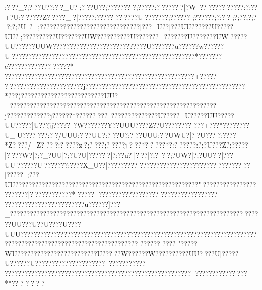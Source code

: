{{{{{{{{{{{{{{{{{{{{{{{{{{{{{{{{{{{{{{{{{{{{{{{{{{{{{{{{{{{{{{{{{{{{{{{{{{{{{{{{{{{{{{{{{{{{{{{{{{{{{{{{{{{{{{{{{{{{{{{{{{{{{{{{{{{{{{{{{{{{{{{{{{{{{{{{{{{{{{{{{{{{{{{{{{{{{{{{{{{{{{{{{{{{{{{{{{{{{{{{{{{{{{{{{{{{{{{{{{{{{{{{{{{{{{{{{{{{{{{{{{{{{{{{{{{{{{{{{{{{{{{{{{{{{{{{{{{{{{{{{{{{{{{{{{{{{{{{{{{{{{{{{{{{{{{{{{{{{{{{{{{{{{{{{{{{{{{{{{{{{{{{{{{{{{{{{{{{{{{{{{{{{{{{{{{{{{{{{{{{{{{{{{{{{{{{{{{{{{{{{{{{{{{{{{{{{{{{{{{{{{{{{{{{{{{{{{{{{{{{{{{{{{{{{{{{{{{{{{{{{{{{{{{{{{{{{{{{{{{{{{{{{{{{{{:???_ ?;???U??:??_U?;???U??;????????;?????:???????[?W~???\??????\?????:?;??+?U:??????Z?????_?|?????;????? 
??????U???????;??????
;?????? ;?;?? ;?;??   ;?;?  ?;?;?U~?_;?}???\???????????????}???????}?????|???_U??|???UU??????U???\???UU?;??????????U???????UW??????    ????U???????_???????U???????UW?????UU??????UUW????????????????????????????U???????u??????w??????U???????????????????????????????????????????????????????*???????e?????????????
?????*
?????????????????????????????????????????????????????????+?????
???????????????????????j????????????????????????????????????????????????*???(?????????????????????????UU?_??????????????????????????????????????????????????????????????j?????????????j??????*?????????~??}??????}??????U?????_U?????UU?????UU?????]U???jj?????~?W???????Y??UUU????Z??U???? ????
???+  ???*  ????????U_U???? ???  :??/UUU:???UU?:???U}?:???UUU;??UWU?[??U????;????*Z????/+Z??? ?:?????z?;????;?????j???*?????*?:??????:?;?U???Z?;?????|????W?|?;?_?UU|?;?U?U|??????|?;??u?|?? ?  |?;?~ ? |?;?UW? |?;?UU? ?|???UU??????U???????;????X_U??|?????????
?????????????????????????????? ??|?????;???UU??\? ?????????  ??????? ?????????????????????????????????????"|?????????????????\???  ??\???  |????????????* ?????
 ??????  ??????? ?????
  ??????  ?????   ?????? ?????? ??????????????????u??????]???_??????????????????????????????????????????????????????????????????? ???  ???   ???UU???U??U????U????UUU???????????????????????????????????????????????????????????????????????????????????????????????????????????????
??????
????
" ?????WU????   ????????????????????U?????W??????W??????????UU????U]?????U??????U????????????????????????????????
?????? ????? ????? ????? ?????? ?????? ???????????????????????
?????  ?????  ?????**????  ???   
}}}}}}}}}}}}}}}}}}}}}}}}}}}}}}}}}}}}}}}}}}}}}}}}}}}}}}}}}}}}}}}}}}}}}}}}}}}}}}}}}}}}}}}}}}}}}}}}}}}}}}}}}}}}}}}}}}}}}}}}}}}}}}}}}}}}}}}}}}}}}}}}}}}}}}}}}}}}}}}}}}}}}}}}}}}}}}}}}}}}}}}}}}}}}}}}}}}}}}}}}}}}}}}}}}}}}}}}}}}}}}}}}}}}}}}}}}}}}}}}}}}}}}}}}}}}}}}}}}}}}}}}}}}}}}}}}}}}}}}}}}}}}}}}}}}}}}}}}}}}}}}}}}}}}}}}}}}}}}}}}}}}}}}}}}}}}}}}}}}}}}}}}}}}}}}}}}}}}}}}}}}}}}}}}}}}}}}}}}}}}}}}}}}}}}}}}}}}}}}}}}}}}}}}}}}}}}}}}}}}}}}}}}}}}}}}}}}}}}}}}}}}}}}}}}}}}}}}}}}}}}}}}}}}}}}}}}}}}}}}}}}}
